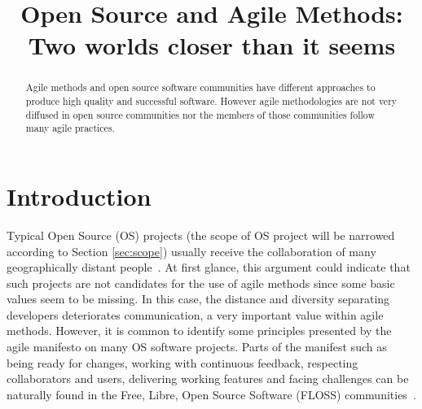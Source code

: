 \documentclass[lnbip]{svmultln}
\begin{document}
\mainmatter

\title{Open Source and Agile Methods:\\Two worlds closer than it
  seems}


\author{}



\institute{}
 
\maketitle

\begin{abstract}
  Agile methods and open source software communities have different
  approaches to produce high quality and successful software. However
  agile methodologies are not very diffused in open source communities
  nor the members of those communities follow many agile
  practices.


\end{abstract}

\section{Introduction}

Typical Open Source (OS) projects (the scope of OS project will be
narrowed according to Section \ref{sec:scope}) usually receive the
collaboration of many geographically distant
people~\cite{report:dempsey1999}. At first glance, this argument could
indicate that such projects are not candidates for the use of agile
methods since some basic values seem to be missing. In this case, the
distance and diversity separating developers deteriorates
communication, a very important value within agile methods. However,
it is common to identify some principles presented by the agile
manifesto \cite{url:agilemanifesto} on many OS software
projects. Parts of the manifest such as being ready for changes,
working with continuous feedback, respecting collaborators and users,
delivering working features and facing challenges can be naturally
found in the Free, Libre, Open Source Software (FLOSS)
communities~\cite{gabriel2005}.
\end{document}
